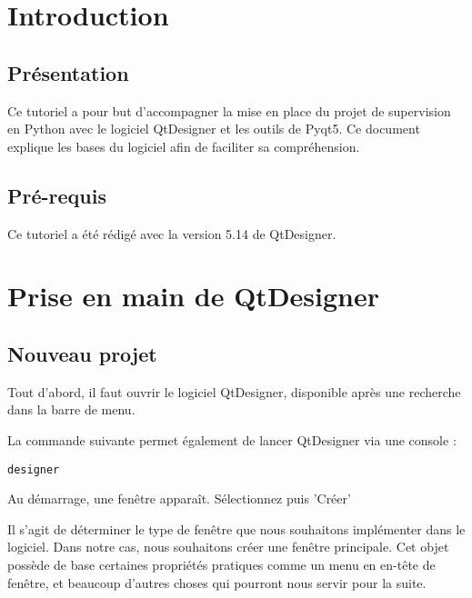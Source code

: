 \chapter{Introduction}

\section{Présentation}

Ce tutoriel a pour but d'accompagner la mise en place du projet de supervision en Python avec le logiciel QtDesigner et les outils de Pyqt5. Ce document explique les bases du logiciel afin de faciliter sa compréhension.

\section{Pré-requis}

Ce tutoriel a été rédigé avec la version 5.14 de QtDesigner. \newline

\chapter{Prise en main de QtDesigner}

\section{Nouveau projet}

Tout d'abord, il faut ouvrir le logiciel QtDesigner, disponible après une recherche dans la barre de menu.


La commande suivante permet également de lancer QtDesigner via une console : 
\begin{lstlisting}
designer
\end{lstlisting}
Au démarrage, une fenêtre apparaît. Sélectionnez  puis 'Créer'



Il s'agit de déterminer le type de fenêtre que nous souhaitons implémenter dans le logiciel. Dans notre cas, nous souhaitons créer une fenêtre principale. Cet objet possède de base certaines propriétés pratiques comme un menu en en-tête de fenêtre, et beaucoup d'autres choses qui pourront nous servir pour la suite.

